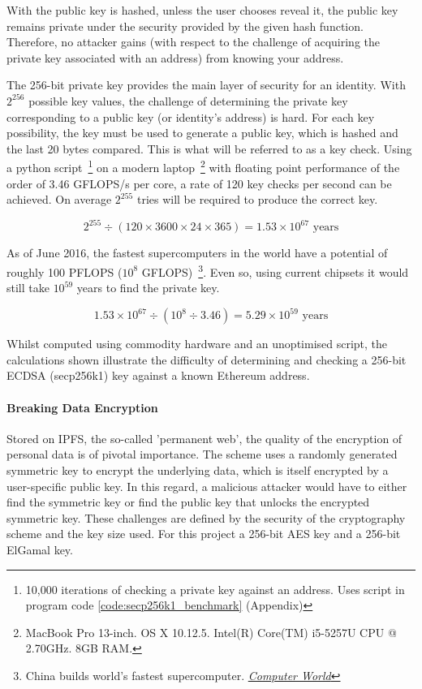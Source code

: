With the public key is hashed, unless the user chooses reveal it, the public key remains private under the security provided by the given hash function. Therefore, no attacker gains (with respect to the challenge of acquiring the private key associated with an address) from knowing your address.

The 256-bit private key provides the main layer of security for an identity. With $2^{256}$ possible key values, the challenge of determining the private key corresponding to a public key (or identity's address) is hard. For each key possibility, the key must be used to generate a public key, which is hashed and the last 20 bytes compared. This is what will be referred to as a key check. Using a python script~\footnote{10,000 iterations of checking a private key against an address. Uses script in program code \ref{code:secp256k1_benchmark} (Appendix)} on a modern laptop~\footnote{MacBook Pro 13-inch. OS X 10.12.5. Intel(R) Core(TM) i5-5257U CPU @ 2.70GHz. 8GB RAM.} with floating point performance of the order of 3.46 GFLOPS/s per core, a rate of 120 key checks per second can be achieved. On average $2^{255}$ tries will be required to produce the correct key.

$$
2^{255} \div (120 \times 3600 \times 24 \times 365) = 1.53 \times 10^{67} \text{ years}
$$

As of June 2016, the fastest supercomputers in the world have a potential of roughly 100 PFLOPS ($10^8$ GFLOPS)~\footnote{China builds world's fastest supercomputer.  \href{http://www.computerworld.com/article/3085483/high-performance-computing/china-builds-world-s-fastest-supercomputer-without-u-s-chips.html}{\textit{Computer World}}}. Even so, using current chipsets it would still take $10^{59}$ years to find the private key.

$$
1.53 \times 10^{67} \div (10^8 \div 3.46) = 5.29 \times 10^{59} \text{ years}
$$

Whilst computed using commodity hardware and an unoptimised script, the calculations shown illustrate the difficulty of determining and checking a 256-bit ECDSA (secp256k1) key against a known Ethereum address.

\paragraph{Breaking Data Encryption}

Stored on IPFS, the so-called 'permanent web', the quality of the encryption of personal data is of pivotal importance. The scheme uses a randomly generated symmetric key to encrypt the underlying data, which is itself encrypted by a user-specific public key. In this regard, a malicious attacker would have to either find the symmetric key or find the public key that unlocks the encrypted symmetric key. These challenges are defined by the security of the cryptography scheme and the key size used. For this project a 256-bit AES key and a 256-bit ElGamal key.

